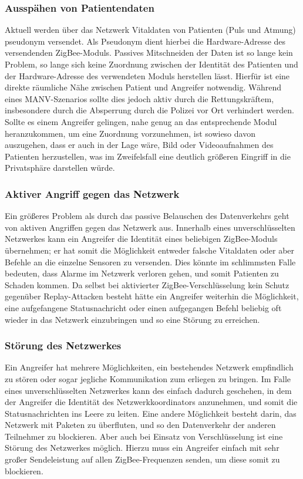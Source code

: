 \subsubsection{Ausspähen von Patientendaten}
Aktuell werden über das Netzwerk Vitaldaten von Patienten (Puls und Atmung) pseudonym versendet. Als Pseudonym dient 
hierbei die Hardware-Adresse des versendenden ZigBee-Moduls. Passives Mitschneiden der Daten ist so lange kein Problem,
so lange sich keine Zuordnung zwischen der Identität des Patienten und der Hardware-Adresse des verwendeten Moduls
herstellen lässt. Hierfür ist eine direkte räumliche Nähe zwischen Patient und Angreifer notwendig. 
Während eines MANV-Szenarios sollte dies jedoch aktiv durch die Rettungskräftem, insbesondere durch die Absperrung durch
die Polizei vor Ort verhindert werden. Sollte es einem Angreifer gelingen, nahe genug an das entsprechende Modul
heranzukommen, um eine Zuordnung vorzunehmen, ist sowieso davon auszugehen, dass er auch in der Lage wäre, Bild oder
Videoaufnahmen des Patienten herzustellen, was im Zweifelsfall eine deutlich größeren Eingriff in die Privatsphäre 
darstellen würde.

\subsubsection{Aktiver Angriff gegen das Netzwerk}
Ein größeres Problem als durch das passive Belauschen des Datenverkehrs geht von aktiven Angriffen gegen das Netzwerk
aus. Innerhalb eines unverschlüsselten Netzwerkes kann ein Angreifer die Identität eines beliebigen ZigBee-Moduls 
übernehmen; er hat somit die Möglichkeit entweder falsche Vitaldaten oder aber Befehle an die einzelne Sensoren zu
versenden. Dies könnte im schlimmsten Falle bedeuten, dass Alarme im Netzwerk verloren gehen, und somit Patienten
zu Schaden kommen. Da selbst bei aktivierter ZigBee-Verschlüsselung kein Schutz gegenüber Replay-Attacken besteht hätte
ein Angreifer weiterhin die Möglichkeit, eine aufgefangene Statusnachricht oder einen aufgegangen Befehl beliebig oft
wieder in das Netzwerk einzubringen und so eine Störung zu erreichen.

\subsubsection{Störung des Netzwerkes}
Ein Angreifer hat mehrere Möglichkeiten, ein bestehendes Netzwerk empfindlich zu stören oder sogar jegliche Kommunikation
zum erliegen zu bringen. Im Falle eines unverschlüsselten Netzwerkes kann des einfach dadurch geschehen, in dem
der Angreifer die Identität des Netzwerkkoordinators anzunehmen, und somit die Statusnachrichten ins Leere zu leiten. Eine
andere Möglichkeit besteht darin, das Netzwerk mit Paketen zu überfluten, und so den Datenverkehr der anderen Teilnehmer
zu blockieren. Aber auch bei Einsatz von Verschlüsselung ist eine Störung des Netzwerkes möglich. Hierzu muss ein Angreifer
einfach mit sehr großer Sendeleistung auf allen ZigBee-Frequenzen senden, um diese somit zu blockieren. 

